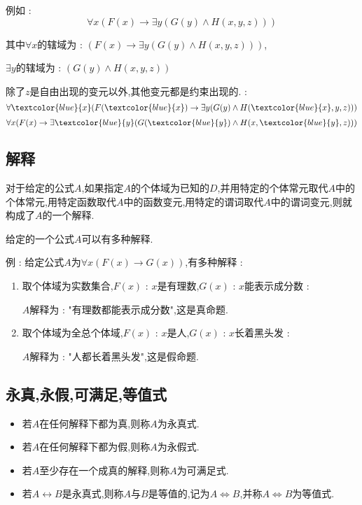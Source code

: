 {{{  例如 : $$
    \forall x (F(x) \to \exists y (G(y) \land H(x,y,z)))
  $$

  其中$\forall x$的辖域为 : $(F(x) \to \exists y (G(y) \land H(x,y,z)))$,

  $\exists y$的辖域为 : $(G(y) \land H(x,y,z))$

  除了$z$是自由出现的变元以外,其他变元都是约束出现的. :
  $$
  \forall \textcolor{blue}{x} (F(\textcolor{blue}{x}) \to \exists y (G(y) \land H(\textcolor{blue}{x},y,z)))
  $$
  $$
  \forall x (F(x) \to \exists \textcolor{blue}{y} (G(\textcolor{blue}{y}) \land H(x,\textcolor{blue}{y},z)))
  $$
  }%

  \subsection{解释}{
    对于给定的公式$A$,如果指定$A$的个体域为已知的$D$,并用特定的个体常元取代$A$中的个体常元,用特定函数取代$A$中的函数变元,用特定的谓词取代$A$中的谓词变元,则就构成了$A$的一个解释.

    给定的一个公式$A$可以有多种解释.

    例 : 给定公式$A$为$\forall x (F(x) \to G(x))$,有多种解释 :
    \begin{enumerate}
      \item {
            取个体域为实数集合,$F(x)$ : $x$是有理数,$G(x)$ : $x$能表示成分数 :

            $A$解释为 : "有理数都能表示成分数",这是真命题.
            }
      \item {
            取个体域为全总个体域,$F(x)$ : $x$是人,$G(x)$ : $x$长着黑头发 :

            $A$解释为 : "人都长着黑头发",这是假命题.
            }
    \end{enumerate}
  }%

  \subsection{永真,永假,可满足,等值式}{
    \begin{itemize}
      \item 若$A$在任何解释下都为真,则称$A$为永真式.
      \item 若$A$在任何解释下都为假,则称$A$为永假式.
      \item 若$A$至少存在一个成真的解释,则称$A$为可满足式.
      \item 若$A \leftrightarrow B$是永真式,则称$A$与$B$是等值的,记为$A \Leftrightarrow B$,并称$A \Leftrightarrow B$为等值式.
    \end{itemize}
  }%

}}
